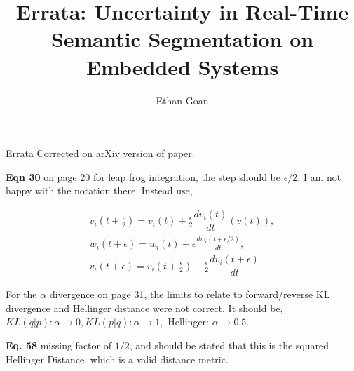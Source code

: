 \documentclass{article}
\title{{\titlefont Errata: Uncertainty in Real-Time Semantic Segmentation on Embedded Systems}}
\author{{\authorfont Ethan Goan}}
\date{} %
\begin{document}
\maketitle
\thispagestyle{fancy} %
Errata Corrected on arXiv version of paper.

\textbf{Eqn 30} on page 20 for leap frog integration, the step should be $\epsilon/2$. I am not happy with the notation there. Instead use,

\begin{align}
  v_i(t + \frac{\epsilon}{2}) = v_i(t) + \frac{\epsilon}{2} \dfrac{dv_{i}(t)}{dt}(v(t)),
  \\
  w_i(t + \epsilon) = w_i(t) + \epsilon \frac{dw_{i}(t + \epsilon /2)}{dt},
  \\
  v_i(t + \epsilon) = v_i(t +\frac{\epsilon}{2}) + \frac{\epsilon}{2} \dfrac{dv_{i}(t + \epsilon)}{dt}.
\end{align}

For the $\alpha$ divergence on page 31, the limits to relate to forward/reverse KL divergence and Hellinger distance were not correct. It should be, $KL(q|p): \alpha \rightarrow 0, KL(p|q): \alpha \rightarrow 1,$ Hellinger: $ \alpha \rightarrow 0.5$.

\textbf{Eq. 58} missing factor of $1/2$, and should be stated that this is the squared Hellinger Distance, which is a valid distance metric.
\end{document}
